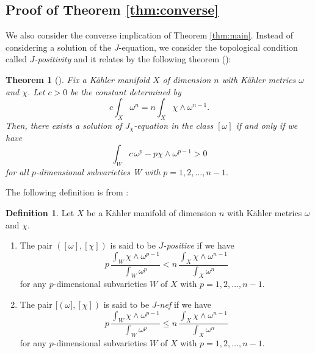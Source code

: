 \documentclass{amsart}
\numberwithin{equation}{section}
\theoremstyle{plain}
\newtheorem{theorem}[equation]{Theorem}
\theoremstyle{definition}
\newtheorem{definition}[equation]{Definition}
\theoremstyle{remark}
\begin{document}
\subsection{Proof of Theorem \ref{thm:converse}}\label{sec:converse}

We also consider the converse implication of Theorem \ref{thm:main}. Instead of considering a solution of the $J$-equation, we consider the topological condition called \textit{$J$-positivity} and it relates by the following theorem (\cite{Song}):

\begin{theorem}[{\cite[Corollary 1.2]{Song}}]\label{J-positivity}
Fix a K{\"a}hler manifold $X$ of dimension $n$ with K{\"a}hler metrics $\omega$ and $\chi$. 
Let $c > 0$ be the constant determined by 
$$c \int_X \omega^n = n \int_X \chi \wedge \omega^{n-1}.$$
Then, there exists a solution of $J_\chi$-equation in the class $[\omega]$ if and only if %
we have
$$\int_W c\,\omega^p - p \chi \wedge \omega^{p-1} > 0$$
for all $p$-dimensional subvarieties W with $p = 1,2,\dots,{n-1}.$
\end{theorem} 
The following definition is from \cite[Definition 1.1]{Song}:

\begin{definition}
Let $X$ be a K{\"a}hler manifold of dimension $n$ with K{\"a}hler metrics $\omega$ and $\chi$.
\begin{enumerate}%
\item
The pair $([\omega],[\chi])$ is said to be \textit{$J$-positive} if we have
$$ p \, \frac{\int_W \chi \wedge \omega^{p-1}}{\int_W \omega^p} <
n \, \frac{\int_X \chi \wedge \omega^{n-1}}{\int_X \omega^n}$$
for any $p$-dimensional subvarieties $W$ of $X$ with $p = 1,2,\dots,{n-1}$.
\item
The pair $[(\omega],[\chi])$ is said to be \textit{$J$-nef} if we have
$$ p \, \frac{\int_W \chi \wedge \omega^{p-1}}{\int_W \omega^p} \le
n \, \frac{\int_X \chi \wedge \omega^{n-1}}{\int_X \omega^n}$$
for any $p$-dimensional subvarieties $W$ of $X$ with $p = 1,2,\dots,{n-1}$.
\end{enumerate}
\end{definition}
\end{document}

